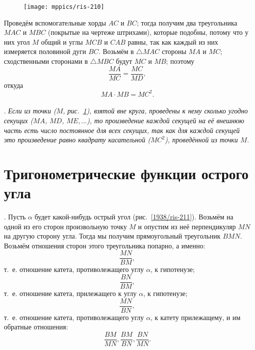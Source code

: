 \documentclass[oneside]{book}
\begin{document}
\begin{figure}[h!]
\centering
\texttt{[image: mppics/ris-210]}
\caption{}\label{1938/ris-210}
\end{figure}

Проведём вспомогательные хорды $AC$ и $BC$;
тогда получим два треугольника $MAC$ и $MBC$ (покрытые на чертеже штрихами), которые подобны, потому что у них угол $M$ общий и углы $MCB$ и $CAB$ равны, так как каждый из них измеряется половиной дуги $BC$.
Возьмём в $\triangle MAC$ стороны $MA$ и $MC$;
сходственными сторонами в $\triangle MBC$ будут $MC$ и $MB$;
поэтому
\[\frac{MA}{MC} = \frac{MC}{MD},\]
откуда
\[MA\cdot MB=MC^2.\]

\paragraph{}\label{1938/202}
.
\emph{Если из точки \emph{($M$, рис.~\ref{1938/ris-210}),} взятой вне круга, проведены к нему сколько угодно секущих ($MA$, $MD$, $ME,\dots$), то произведение каждой секущей на её внешнюю часть есть число постоянное для всех секущих, так как для каждой секущей это произведение равно квадрату касательной ($MC^2$), проведённой из точки $M$.}


\section{Тригонометрические функции острого угла}


\paragraph{}\label{1938/203}
.
Пусть $\alpha$ будет какой-нибудь острый угол (рис.~\ref{1938/ris-211}).
Возьмём на одной из его сторон произвольную точку $M$ и опустим из неё перпендикуляр $MN$ на другую сторону угла.
Тогда мы получим прямоугольный треугольник $BMN$.
Возьмём отношения сторон этого треугольника попарно, а именно:
\[\frac{MN}{BM},\]
т.~е. отношение катета, противолежащего углу $\alpha$, к гипотенузе;
\[\frac{BN}{BM},\]
т.~е. отношение катета, прилежащего к углу $\alpha$, к гипотенузе;
\[\frac{MN}{BN},\]
т.~е. отношение катета, противолежащего углу $\alpha$, к катету прилежащему, и им обратные отношения:
\[\frac{BM}{MN}, \frac{BM}{BN}, \frac{BN}{MN}.\]
\end{document}

